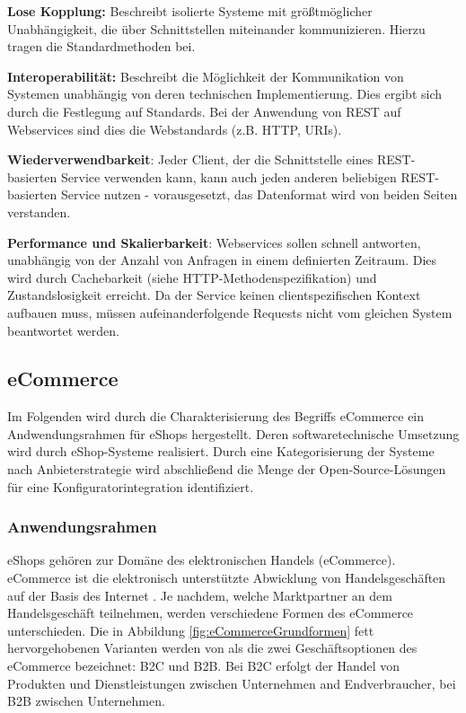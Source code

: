 \documentclass[12pt,a4paper,bibliography=totocnumbered,listof=totoc]{scrartcl}
\begin{document}
\begin{compactitem}
\item \textbf{Lose Kopplung:} Beschreibt isolierte Systeme mit größtmöglicher Unabhängigkeit, die über Schnittstellen miteinander kommunizieren. Hierzu tragen die Standardmethoden bei.
\item \textbf{Interoperabilität:} Beschreibt die Möglichkeit der Kommunikation von Systemen unabhängig von deren technischen Implementierung. Dies ergibt sich durch die Festlegung auf Standards. Bei der Anwendung von REST auf Webservices sind dies die Webstandards (z.B. HTTP, URIs).
\item \textbf{Wiederverwendbarkeit}: Jeder Client, der die Schnittstelle eines REST-basierten Service verwenden kann, kann auch jeden anderen beliebigen REST-basierten Service nutzen - vorausgesetzt, das Datenformat wird von beiden Seiten verstanden.
\item \textbf{Performance und Skalierbarkeit}: Webservices sollen schnell antworten, unabhängig von der Anzahl von Anfragen in einem definierten Zeitraum. Dies wird durch Cachebarkeit (siehe HTTP-Methodenspezifikation) und Zustandslosigkeit erreicht. Da der Service keinen clientspezifischen Kontext aufbauen muss, müssen aufeinanderfolgende Requests nicht vom gleichen System beantwortet werden.
\end{compactitem}
\pagebreak

\subsection{eCommerce}

Im Folgenden wird durch die Charakterisierung des Begriffs eCommerce ein Andwendungsrahmen für eShops hergestellt. Deren softwaretechnische Umsetzung wird durch eShop-Systeme realisiert. Durch eine Kategorisierung der Systeme nach Anbieterstrategie wird abschließend die Menge der Open-Source-Lösungen für eine Konfiguratorintegration identifiziert.

\subsubsection{Anwendungsrahmen}
eShops gehören zur Domäne des elektronischen Handels (eCommerce). eCommerce ist \glqq die elektronisch unterstützte Abwicklung von Handelsgeschäften auf der Basis des Internet\grqq{} \citep{schwarze02}. Je nachdem, welche Marktpartner an dem Handelsgeschäft teilnehmen, werden verschiedene Formen des eCommerce unterschieden. Die in Abbildung \ref{fig:eCommerceGrundformen} fett hervorgehobenen Varianten werden von \citet{meier12} als \glqq die zwei Geschäftsoptionen des eCommerce\grqq{} bezeichnet: \ac{B2C} und \ac{B2B}. Bei \ac{B2C} erfolgt der Handel von Produkten und Dienstleistungen zwischen Unternehmen and Endverbraucher, bei \ac{B2B} zwischen Unternehmen.
\end{document}
